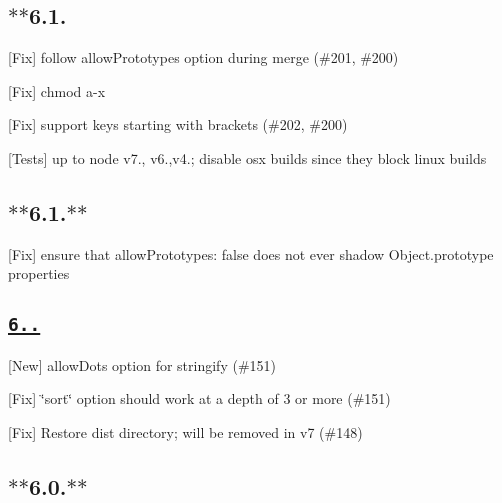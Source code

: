 \subsection*{$\ast$$\ast$6.1.}


\begin{DoxyItemize}
\item \mbox{[}Fix\mbox{]} follow {\ttfamily allow\+Prototypes} option during merge (\#201, \#200)
\item \mbox{[}Fix\mbox{]} chmod a-\/x
\item \mbox{[}Fix\mbox{]} support keys starting with brackets (\#202, \#200)
\item \mbox{[}Tests\mbox{]} up to {\ttfamily node} {\ttfamily v7.}, {\ttfamily v6.},{\ttfamily v4.}; disable osx builds since they block linux builds
\end{DoxyItemize}

\subsection*{$\ast$$\ast$6.1.$\ast$$\ast$}


\begin{DoxyItemize}
\item \mbox{[}Fix\mbox{]} ensure that {\ttfamily allow\+Prototypes\+: false} does not ever shadow Object.\+prototype properties
\end{DoxyItemize}

\subsection*{\href{https://github.com/ljharb/qs/issues?milestone=35&state=closed}{\tt {\bfseries 6..}}}


\begin{DoxyItemize}
\item \mbox{[}New\mbox{]} allow\+Dots option for {\ttfamily stringify} (\#151)
\item \mbox{[}Fix\mbox{]} \char`\"{}sort\char`\"{} option should work at a depth of 3 or more (\#151)
\item \mbox{[}Fix\mbox{]} Restore {\ttfamily dist} directory; will be removed in v7 (\#148)
\end{DoxyItemize}

\subsection*{$\ast$$\ast$6.0.$\ast$$\ast$}


